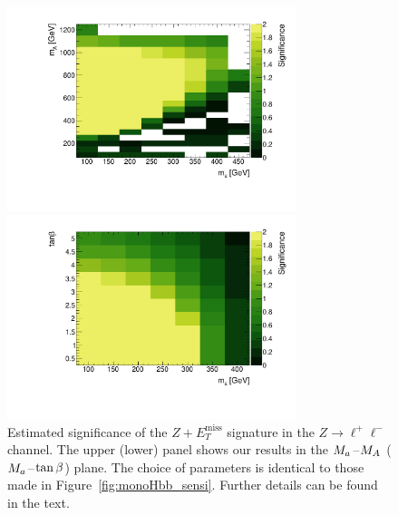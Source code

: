 \documentclass[a4paper, 11pt,notoc]{article}
\newcommand{\MET}{\ensuremath{E_T^\mathrm{miss}}\xspace}
\newcommand{\mA}{\ensuremath{M_{A}}\xspace}
\newcommand{\ma}{\ensuremath{M_{a}}\xspace}
\begin{document}
\begin{figure}[t!]
\centering
\includegraphics[width=0.75\textwidth]{mAma_Significance_ll.pdf}

\vspace{2mm}

\includegraphics[width=0.75\textwidth]{tanbma_Significance_ll.pdf}
\vspace{2mm}
\caption{Estimated significance of the $Z+\MET$ signature in the $Z \to \ell^+ \ell^-$ channel. The upper (lower) panel shows our results in the $\ma\hspace{0.25mm}$--$\hspace{0.25mm}\mA$ ($\ma\hspace{0.25mm}$--$\hspace{0.25mm}\tan \beta$) plane. {\color{blue} The choice of parameters is identical to those made in Figure~\ref{fig:monoHbb_sensi}.} Further details can be found in the text. }
\label{fig:monoZll_sensi}
\end{figure}
 
\end{document}
